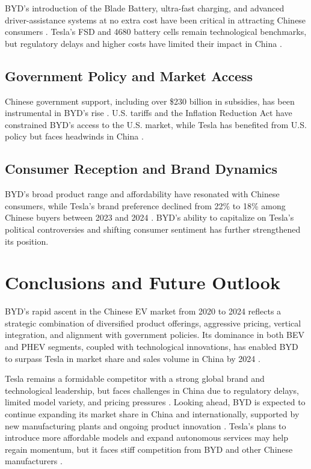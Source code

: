 \documentclass{article}
\begin{document}
BYD's introduction of the Blade Battery, ultra-fast charging, and advanced driver-assistance systems at no extra cost have been critical in attracting Chinese consumers \citep{cnn2025, scmp2024}. Tesla's FSD and 4680 battery cells remain technological benchmarks, but regulatory delays and higher costs have limited their impact in China \citep{investors2025}.

\subsection{Government Policy and Market Access}

Chinese government support, including over \$230 billion in subsidies, has been instrumental in BYD's rise \citep{time2024}. U.S. tariffs and the Inflation Reduction Act have constrained BYD's access to the U.S. market, while Tesla has benefited from U.S. policy but faces headwinds in China \citep{ielp2024, techresearchonline2024}.

\subsection{Consumer Reception and Brand Dynamics}

BYD's broad product range and affordability have resonated with Chinese consumers, while Tesla's brand preference declined from 22\% to 18\% among Chinese buyers between 2023 and 2024 \citep{scmp2024}. BYD's ability to capitalize on Tesla's political controversies and shifting consumer sentiment has further strengthened its position.

\section{Conclusions and Future Outlook}

BYD's rapid ascent in the Chinese EV market from 2020 to 2024 reflects a strategic combination of diversified product offerings, aggressive pricing, vertical integration, and alignment with government policies. Its dominance in both BEV and PHEV segments, coupled with technological innovations, has enabled BYD to surpass Tesla in market share and sales volume in China by 2024 \citep{cnn2025, statista2024}.

Tesla remains a formidable competitor with a strong global brand and technological leadership, but faces challenges in China due to regulatory delays, limited model variety, and pricing pressures \citep{investors2025, cnevpost2025}. Looking ahead, BYD is expected to continue expanding its market share in China and internationally, supported by new manufacturing plants and ongoing product innovation \citep{investors2025, gasgoo2024}. Tesla's plans to introduce more affordable models and expand autonomous services may help regain momentum, but it faces stiff competition from BYD and other Chinese manufacturers \citep{teslarati2025}.
\end{document}
